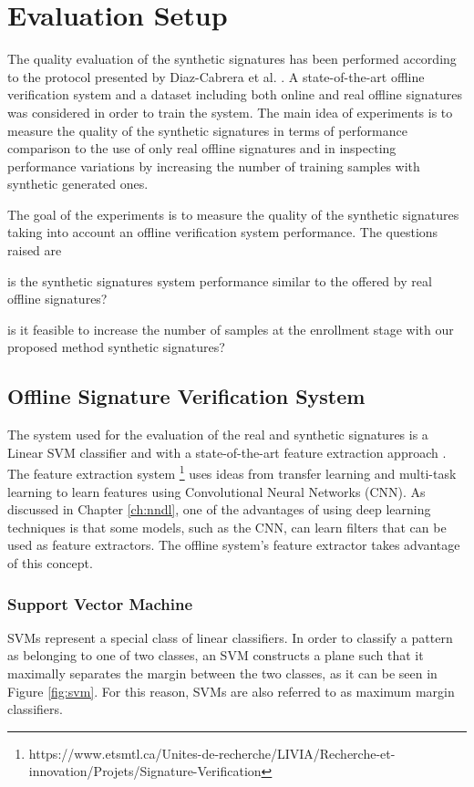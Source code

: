 
\chapter{Evaluation Setup}\label{ch:exp}

The quality evaluation of the synthetic signatures has been performed according to the protocol presented by Diaz-Cabrera et al. \cite{diaz2014generation}. A state-of-the-art offline verification system and a dataset including both online and real offline signatures was considered in order to train the system. The main idea of experiments is to measure the quality of the synthetic signatures in terms of performance comparison to the use of only real offline signatures and in inspecting performance variations by increasing the number of training samples with synthetic generated ones.

The goal of the experiments is to measure the quality of the synthetic signatures taking into account an offline verification system performance. The questions raised are \begin{inlinelist}
  \item is the synthetic signatures system performance similar to the offered by real offline signatures?
  \item is it feasible to increase the number of samples at the enrollment stage with our proposed method synthetic signatures? 
\end{inlinelist}



\section{Offline Signature Verification System}
The system used for the evaluation of the real and synthetic signatures is a Linear SVM classifier and with a state-of-the-art feature extraction approach  \cite{hafemann2017learning}. The feature extraction system \footnote{https://www.etsmtl.ca/Unites-de-recherche/LIVIA/Recherche-et-innovation/Projets/Signature-Verification} uses ideas from transfer learning and multi-task learning to learn features using Convolutional Neural Networks (CNN). As discussed in Chapter \ref{ch:nndl}, one of the advantages of using deep learning techniques is that some models, such as the CNN, can learn filters that can be used as feature extractors. The offline system's feature extractor takes advantage of this concept.

\subsection {Support Vector Machine} 
SVMs represent a special class of linear classifiers. In order to classify a pattern as
belonging to one of two classes, an SVM constructs a plane such that it maximally separates the margin between the two classes, as it can be seen in Figure \ref{fig:svm}. For this reason, SVMs are also referred to as maximum margin classifiers.


